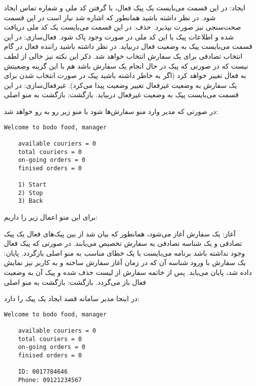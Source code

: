 \documentclass[../main.tex]{subfiles}
\begin{document}
 ایجاد: در این قسمت می‌بایست یک پیک فعال، با گرفتن کد ملی و شماره تماس ایجاد شود. در نظر داشته باشید همانطور که اشاره شد نیاز است در این قسمت صحت‌سنجی نیز صورت بپذیرد.
 حذف:‌ در این قسمت می‌بایست یک کد ملی دریافت شده و اطلاعات پیک با این کد ملی در صورت وجود پاک شود.
 فعال‌سازی: در این قسمت می‌بایست پیک به وضعیت فعال دربیاید. در نظر داشته باشید راننده فعال در گام انتخاب تصادفی برای یک سفارش انتخاب خواهد شد. ذکر این نکته نیز خالی از لطف نیست که در صورتی که پیک در حال انجام یک سفارش باشد هم با این گزینه وضعیتش به فعال تغییر خواهد کرد (اگر به خاطر داشته باشید پیک در صورت انتخاب شدن برای یک سفارش به وضعیت غیرفعال تغییر وضعیت پیدا می‌کرد).
 غیرفعال‌سازی:‌ در این قسمت می‌بایست پیک به وضعیت غیرفعال دربیاید.
 بازگشت: بازگشت به منو اصلی

در صورتی که مدیر وارد منو سفارش‌ها شود با منو زیر رو به رو خواهد شد:

\begin{latin}
\begin{lstlisting}[]
    Welcome to bodo food, manager

    available couriers = 0
    total couriers = 0
    on-going orders = 0
    finised orders = 0

    1) Start
    2) Stop
    3) Back
\end{lstlisting}
\end{latin}

برای این منو اعمال زیر را داریم:

 آغاز: یک سفارش آغاز می‌شود، همانطور که بیان شد از بین پیک‌های فعال یک پیک تصادفی و یک شناسه تصادفی به سفارش تخصیص می‌یابند. در صورتی که پیک فعال وجود نداشته باشد برنامه می‌بایست با یک خطای مناسب به منو اصلی بازگردد.
 پایان: یک سفارش با ورود شناسه آن که در زمان آغاز سفارش ساخته و به کاربر نیز نمایش داده شد، پایان می‌یابد. پس از خاتمه سفارش از لیست حذف شده و پیک آن به وضعیت فعال باز می‌گردد.
 بازگشت: بازگشت به منو اصلی

در اینجا مدیر سامانه قصد ایجاد یک پیک را دارد:

\begin{latin}
\begin{lstlisting}[]
    Welcome to bodo food, manager

    available couriers = 0
    total couriers = 0
    on-going orders = 0
    finised orders = 0

    ID: 0017784646
    Phone: 09121234567
\end{lstlisting}
\end{latin}
\end{document}
